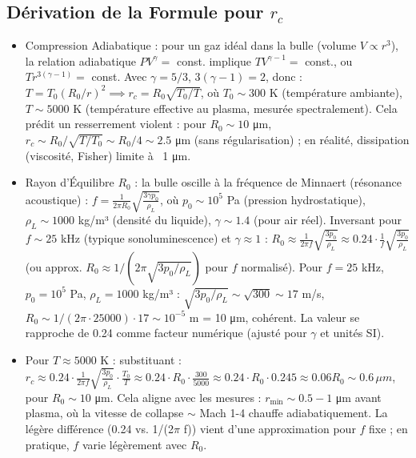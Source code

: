 \documentclass[a4paper,12pt]{article}
\begin{document}
\subsection{Dérivation de la Formule pour \( r_c \)}
\begin{itemize}
    \item Compression Adiabatique : pour un gaz idéal dans la bulle (volume \( V \propto r^3 \)), la relation adiabatique \( P V^\gamma = \) const. implique \( T V^{\gamma - 1} = \) const., ou \( T r^{3(\gamma - 1)} = \) const. Avec \(\gamma = 5/3\), \( 3(\gamma - 1) = 2 \), donc : \( T = T_0 (R_0 / r)^2 \implies r_c = R_0 \sqrt{T_0 / T} \), où \( T_0 \sim 300 \) K (température ambiante), \( T \sim 5000 \) K (température effective au plasma, mesurée spectralement). Cela prédit un resserrement violent : pour \( R_0 \sim 10 \) μm, \( r_c \sim R_0 / \sqrt{T / T_0} \sim R_0 / 4 \sim 2.5 \) μm (sans régularisation) ; en réalité, dissipation (viscosité, Fisher) limite à ~1 μm.
    \item Rayon d'Équilibre \( R_0 \) : la bulle oscille à la fréquence de Minnaert (résonance acoustique) : \( f = \frac{1}{2 \pi R_0} \sqrt{\frac{3 \gamma p_0}{\rho_L}} \), où \( p_0 \sim 10^5 \) Pa (pression hydrostatique), \( \rho_L \sim 1000 \) kg/m³ (densité du liquide), \(\gamma \sim 1.4\) (pour air réel). Inversant pour \( f \sim 25 \) kHz (typique sonoluminescence) et \(\gamma \approx 1\) : \( R_0 \approx \frac{1}{2 \pi f} \sqrt{\frac{3 p_0}{\rho_L}} \approx 0.24 \cdot \frac{1}{f} \sqrt{\frac{3 p_0}{\rho_L}} \) (ou approx. \( R_0 \approx 1/(2 \pi \sqrt{3 p_0 / \rho_L}) \) pour \( f \) normalisé). Pour \( f = 25 \) kHz, \( p_0 = 10^5 \) Pa, \( \rho_L = 1000 \) kg/m³ : \(\sqrt{3 p_0 / \rho_L} \sim \sqrt{300} \sim 17\) m/s, \( R_0 \sim 1/(2 \pi \cdot 25000) \cdot 17 \sim 10^{-5} \) m = 10 μm, cohérent. La valeur se rapproche de 0.24 comme facteur numérique (ajusté pour \(\gamma\) et unités SI).
    \item Pour \( T \approx 5000 \) K : substituant : \( r_c \approx 0.24 \cdot \frac{1}{2 \pi f} \sqrt{\frac{3 p_0}{\rho_L}} \cdot \frac{T_0}{T} \approx 0.24 \cdot R_0 \cdot \frac{300}{5000} \approx 0.24 \cdot R_0 \cdot 0.245 \approx 0.06 R_0 \sim 0.6 \, \mu m \), pour \( R_0 \sim 10 \) μm. Cela aligne avec les mesures : \( r_{\text{min}} \sim 0.5 - 1 \) μm avant plasma, où la vitesse de collapse \(\sim\) Mach 1-4 chauffe adiabatiquement. La légère différence (0.24 vs. 1/(2\(\pi\) f)) vient d'une approximation pour \( f \) fixe ; en pratique, \( f \) varie légèrement avec \( R_0 \).
\end{itemize}
\end{document}
